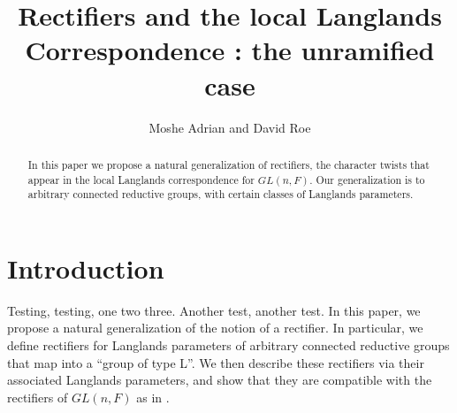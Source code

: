 \documentclass[11pt]{amsart}
\theoremstyle{plain}
\theoremstyle{definition}
\begin{document}
\title{Rectifiers and the local Langlands Correspondence : the unramified case}
\author{Moshe Adrian and David Roe}



\begin{abstract}

\maketitle

In this paper we propose a natural generalization of rectifiers, the
character twists that appear in the local Langlands correspondence for
$GL(n,F)$.  Our generalization is to arbitrary connected reductive
groups, with certain classes of Langlands parameters.

\end{abstract}

\section{Introduction}
Testing, testing, one two three.  Another test, another test.  In this paper, we propose a natural generalization of the notion of a
rectifier.  In particular, we define rectifiers for Langlands
parameters of arbitrary connected reductive groups that map into a
``group of type L''.  We then describe these rectifiers via their
associated Langlands parameters, and show that they are compatible
with the rectifiers of $GL(n,F)$ as in \cite{bushnellhenniart}.
\end{document}
